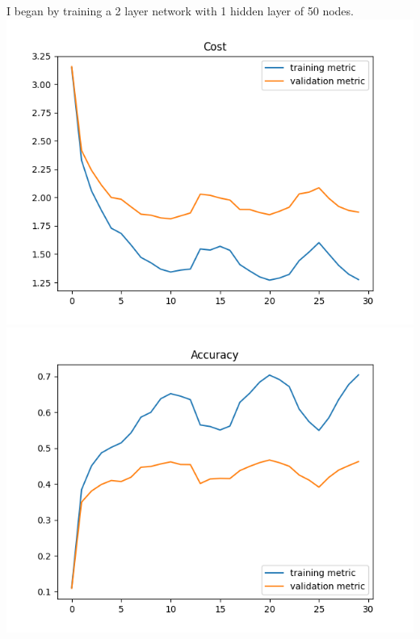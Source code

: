 \documentclass[11pt,a4paper]{article}
\begin{document}
I began by training a 2 layer network with 1 hidden layer of 50 nodes. 
\includegraphics[width=\textwidth]{cost_k=1.png}
\includegraphics[width=\textwidth]{accuracy_k=1.png}\\
\end{document}
